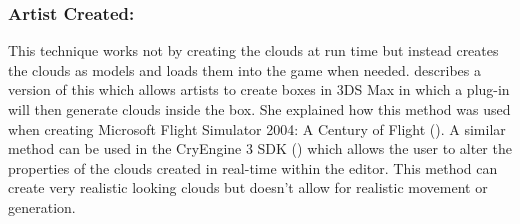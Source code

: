 \subsubsection{Artist Created:}
This technique works not by creating the clouds at run time but instead creates the clouds as models and loads them into the game when needed.
\citet{NWang04} describes a version of this which allows artists to create boxes in 3DS Max in which a plug-in will then generate clouds inside the box.
She explained how this method was used when creating Microsoft Flight Simulator 2004: A Century of Flight (\citeyear{MFS03}).
A similar method can be used in the CryEngine 3 SDK (\citeyear{Crytek13}) which allows the user to alter the properties of the clouds created in real-time within the editor. 
This method can create very realistic looking clouds but doesn't allow for realistic movement or generation.